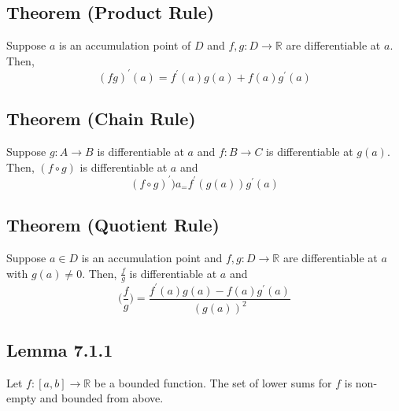 \documentclass[11pt]{book}
\newcommand{\R}{\mathbb{R}}
\begin{document}
		\subsection{Theorem (Product Rule)}
		\label{subsec:productrule}
			\begin{theor}
				Suppose $a$ is an accumulation point of $D$ and $f,g: D \to \R$ are differentiable at $a$. Then, 
				$$(fg)^{\prime}(a) = f^{\prime}(a)g(a) + f(a)g^{\prime}(a)$$
			\end{theor}

		\subsection{Theorem (Chain Rule)}
		\label{subsec:chainrule}
			\begin{theor}
				Suppose $g: A \to B$ is differentiable at $a$ and $f:B \to C$ is differentiable at $g(a)$. Then, $(f \circ g)$ is differentiable at $a$ and 
				$$(f \circ g)^{\prime})a_ = f^{\prime}(g(a))g^{\prime}(a)$$
			\end{theor}

		\subsection{Theorem (Quotient Rule)}
		\label{subsec:quotientrule}
			\begin{theor}
				Suppose $a \in D$ is an accumulation point and $f,g:D \to \R$ are differentiable at $a$ with $g(a) \neq 0$. Then, $\frac{f}{g}$ is 
				differentiable at $a$ and $$\big(\frac{f}{g}\big) = \frac{f^{\prime}(a)g(a) - f(a)g^{\prime}(a)}{(g(a))^2}$$
			\end{theor}

		\subsection{Lemma 7.1.1}
		\label{subsec:lemm711}
			\begin{lemm}
				Let $f:[a,b] \to \R$ be a bounded function. The set of lower sums for $f$ is non-empty and bounded from above.
			\end{lemm}
\end{document}
